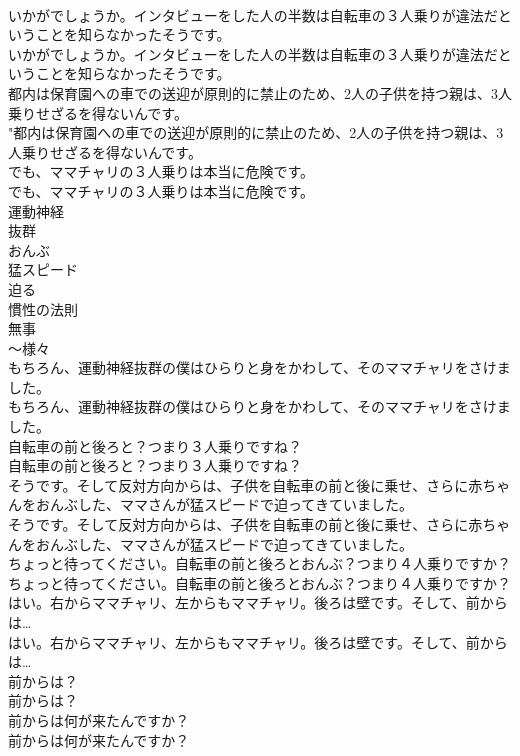 \documentclass[8pt]{extreport}
\begin{document}
\begin{CJK}{UTF8}{min}
\\	いかがでしょうか。インタビューをした人の半数は自転車の３人乗りが違法だということを知らなかったそうです。	
\\	いかがでしょうか。インタビューをした人の半数は自転車の３人乗りが違法だということを知らなかったそうです。 
\\	都内は保育園への車での送迎が原則的に禁止のため、2人の子供を持つ親は、3人乗りせざるを得ないんです。	
\\	"都内は保育園への車での送迎が原則的に禁止のため、2人の子供を持つ親は、3人乗りせざるを得ないんです。 
\\	でも、ママチャリの３人乗りは本当に危険です。	
\\	でも、ママチャリの３人乗りは本当に危険です。 
\\	運動神経
\\	抜群
\\	おんぶ
\\	猛スピード
\\	迫る
\\	慣性の法則
\\	無事
\\	～様々
\\	もちろん、運動神経抜群の僕はひらりと身をかわして、そのママチャリをさけました。	
\\	もちろん、運動神経抜群の僕はひらりと身をかわして、そのママチャリをさけました。 
\\	自転車の前と後ろと？つまり３人乗りですね？	
\\	自転車の前と後ろと？つまり３人乗りですね？ 
\\	そうです。そして反対方向からは、子供を自転車の前と後に乗せ、さらに赤ちゃんをおんぶした、ママさんが猛スピードで迫ってきていました。	
\\	そうです。そして反対方向からは、子供を自転車の前と後に乗せ、さらに赤ちゃんをおんぶした、ママさんが猛スピードで迫ってきていました。 
\\	ちょっと待ってください。自転車の前と後ろとおんぶ？つまり４人乗りですか？	
\\	ちょっと待ってください。自転車の前と後ろとおんぶ？つまり４人乗りですか？ 
\\	はい。右からママチャリ、左からもママチャリ。後ろは壁です。そして、前からは…	
\\	はい。右からママチャリ、左からもママチャリ。後ろは壁です。そして、前からは… 
\\	前からは？	
\\	前からは？ 
\\	前からは何が来たんですか？	
\\	前からは何が来たんですか？ 

\end{CJK}
\end{document}
